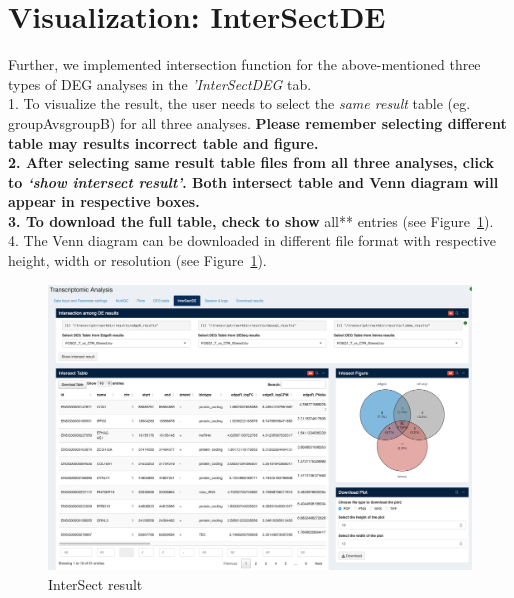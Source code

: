 \documentclass[
  a4paper,
  oneside,
  open=any]{scrreport}
\begin{document}
\hypertarget{visualization-intersectde}{%
\section{Visualization: InterSectDE}\label{visualization-intersectde}}

Further, we implemented intersection function for the above-mentioned
three types of DEG analyses in the \emph{'InterSectDEG} tab.\\
1. To visualize the result, the user needs to select the \emph{same
result} table (eg. groupAvsgroupB) for all three analyses.
\textbf{Please remember selecting different table may results incorrect
table and figure.\\
2. After selecting same result table files from all three analyses,
click to \emph{`show intersect result'}. Both intersect table and Venn
diagram will appear in respective boxes.\\
3. To download the full table, check to show }all** entries (see
Figure~\ref{fig-trans9}).\\
4. The Venn diagram can be downloaded in different file format with
respective height, width or resolution (see Figure~\ref{fig-trans9}).

\begin{figure}[H]

{\centering \includegraphics{./_images/transcriptome/transcript10.png}

}

\caption{\label{fig-trans9}InterSect result}

\end{figure}
\end{document}
